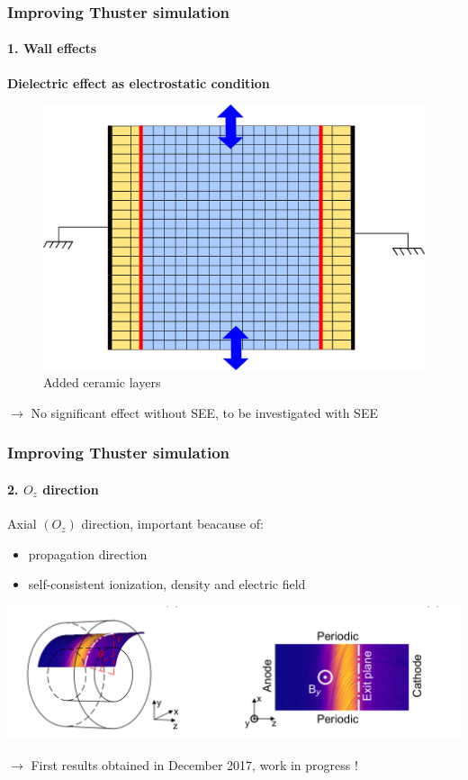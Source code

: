 \documentclass[sans, aspectratio=169]{beamer}
\begin{document}
\begin{frame} 
	\frametitle{Improving Thuster simulation} 
	\framesubtitle{ 1. Wall effects} 

	\textbf{ Dielectric effect as electrostatic condition }
	\begin{figure}[hbtp]
		\centering
		\includegraphics[scale=0.4]{images/2D_diel_Rtheta.png}
		\caption{Added ceramic layers}
	\end{figure}
	
	$\rightarrow$ No significant effect without SEE, to be investigated with SEE 
	
\end{frame}


\begin{frame} 
	\frametitle{Improving Thuster simulation} 
	\framesubtitle{2. $O_z$ direction} 

	Axial $(O_z)$ direction, important beacause of:
	\begin{itemize}
		\item propagation direction
		\item self-consistent ionization, density and electric field
	\end{itemize}		
	
	\includegraphics[scale=0.3]{images/ztheta.png} 
	
	$\rightarrow$ First results obtained in December 2017, work in progress !
\end{frame}
\end{document}
